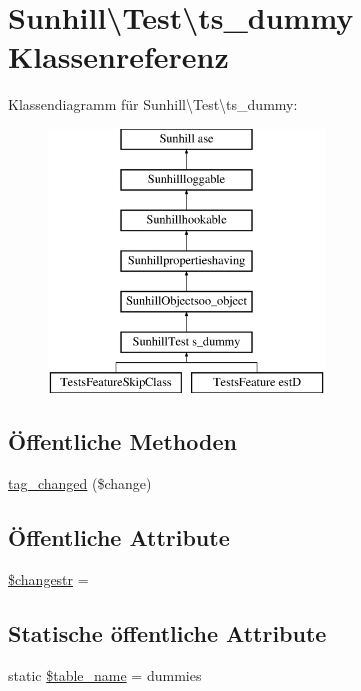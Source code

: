 \hypertarget{classSunhill_1_1Test_1_1ts__dummy}{}\section{Sunhill\textbackslash{}Test\textbackslash{}ts\+\_\+dummy Klassenreferenz}
\label{classSunhill_1_1Test_1_1ts__dummy}
Klassendiagramm für Sunhill\textbackslash{}Test\textbackslash{}ts\+\_\+dummy\+:\begin{figure}[H]
\begin{center}
\leavevmode
\includegraphics[height=7.000000cm]{d8/dc4/classSunhill_1_1Test_1_1ts__dummy}
\end{center}
\end{figure}
\subsection*{Öffentliche Methoden}
\begin{DoxyCompactItemize}
\item 
\hyperlink{classSunhill_1_1Test_1_1ts__dummy_a94b9da32bdefd42c8511229c5ba53398}{tag\+\_\+changed} (\$change)
\end{DoxyCompactItemize}
\subsection*{Öffentliche Attribute}
\begin{DoxyCompactItemize}
\item 
\hyperlink{classSunhill_1_1Test_1_1ts__dummy_a996e6f98f422b8daad508431939bb58c}{\$changestr} = \textquotesingle{}\textquotesingle{}
\end{DoxyCompactItemize}
\subsection*{Statische öffentliche Attribute}
\begin{DoxyCompactItemize}
\item 
static \hyperlink{classSunhill_1_1Test_1_1ts__dummy_a16a6bdc0587f7fcd6d1112e965f749df}{\$table\+\_\+name} = \textquotesingle{}dummies\textquotesingle{}
\end{DoxyCompactItemize}

